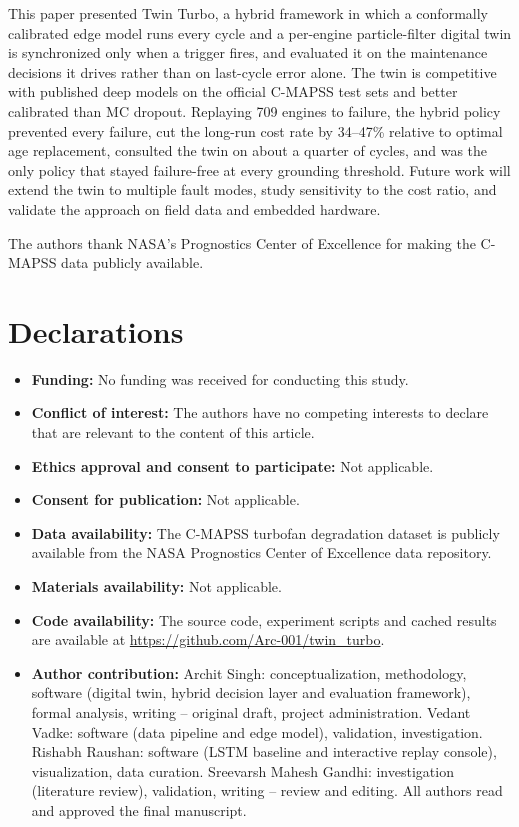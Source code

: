 \documentclass[pdflatex,sn-mathphys-num]{sn-jnl}
\gdef\repourl{\url{https://github.com/Arc-001/twin_turbo}}
\begin{document}
This paper presented Twin Turbo, a hybrid framework in which a conformally calibrated edge model runs every cycle and a per-engine particle-filter digital twin is synchronized only when a trigger fires, and evaluated it on the maintenance decisions it drives rather than on last-cycle error alone. The twin is competitive with published deep models on the official C-MAPSS test sets and better calibrated than MC dropout. Replaying 709 engines to failure, the hybrid policy prevented every failure, cut the long-run cost rate by 34--47\% relative to optimal age replacement, consulted the twin on about a quarter of cycles, and was the only policy that stayed failure-free at every grounding threshold. Future work will extend the twin to multiple fault modes, study sensitivity to the cost ratio, and validate the approach on field data and embedded hardware.

\backmatter

The authors thank NASA's Prognostics Center of Excellence for making the C-MAPSS data publicly available.

\section*{Declarations}

\begin{itemize}
\item \textbf{Funding:} No funding was received for conducting this study.
\item \textbf{Conflict of interest:} The authors have no competing interests to declare that are relevant to the content of this article.
\item \textbf{Ethics approval and consent to participate:} Not applicable.
\item \textbf{Consent for publication:} Not applicable.
\item \textbf{Data availability:} The C-MAPSS turbofan degradation dataset is publicly available from the NASA Prognostics Center of Excellence data repository.
\item \textbf{Materials availability:} Not applicable.
\item \textbf{Code availability:} The source code, experiment scripts and cached results are available at \repourl.
\item \textbf{Author contribution:} Archit Singh: conceptualization, methodology, software (digital twin, hybrid decision layer and evaluation framework), formal analysis, writing -- original draft, project administration. Vedant Vadke: software (data pipeline and edge model), validation, investigation. Rishabh Raushan: software (LSTM baseline and interactive replay console), visualization, data curation. Sreevarsh Mahesh Gandhi: investigation (literature review), validation, writing -- review and editing. All authors read and approved the final manuscript.
\end{itemize}


\end{document}
